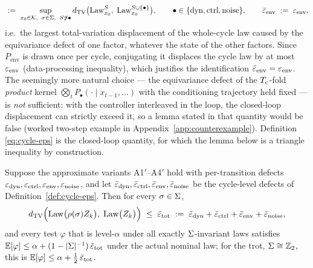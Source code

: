 \begin{definition}
\begin{equation}
  \;:=\;
  \sup_{x_0 \in \mathcal{K},\;\; \sigma \in \Sigma,\;\; S \not\ni \bullet}
  d_{\mathrm{TV}}\bigl( \operatorname{Law}^{S}_{x_0},\; \operatorname{Law}^{S \cup \{\bullet\}}_{x_0} \bigr),
  \qquad \bullet \in \{\mathrm{dyn}, \mathrm{ctrl}, \mathrm{noise}\},
  \qquad
  \bar\varepsilon_{\mathrm{env}} \;:=\; \varepsilon_{\mathrm{env}},
\end{equation}
i.e.\ the largest total-variation displacement of the whole-cycle law caused
by the equivariance defect of one factor, whatever the state of the other
factors. Since $P_{\mathrm{env}}$ is drawn once per cycle, conjugating it
displaces the cycle law by at most $\varepsilon_{\mathrm{env}}$ (data-processing inequality),
which justifies the identification $\bar\varepsilon_{\mathrm{env}} = \varepsilon_{\mathrm{env}}$. The seemingly
more natural choice --- the equivariance defect of the $T_{\mathrm{c}}$-fold
\emph{product} kernel $\bigotimes_t P_{\bullet}(\cdot \mid x_{t-1},\dots)$
with the conditioning trajectory held fixed --- is \emph{not} sufficient:
with the controller interleaved in the loop, the closed-loop displacement can
strictly exceed it, so a lemma stated in that quantity would be false (worked
two-step example in Appendix~\ref{app:counterexample}). Definition
\eqref{eq:cycle-eps} is the closed-loop quantity, for which the lemma below
is a triangle inequality by construction.
\end{definition}

\begin{lemma}
\label{lem:eps}
Suppose the approximate variants A1$'$--A4$'$ hold with per-transition
defects $\varepsilon_{\mathrm{dyn}}, \varepsilon_{\mathrm{ctrl}}, \varepsilon_{\mathrm{env}}, \varepsilon_{\mathrm{noise}}$, and let
$\bar\varepsilon_{\mathrm{dyn}}, \bar\varepsilon_{\mathrm{ctrl}}, \bar\varepsilon_{\mathrm{env}}, \bar\varepsilon_{\mathrm{noise}}$ be the
cycle-level defects of Definition~\ref{def:cycle-eps}. Then for every
$\sigma \in \Sigma$,
\begin{equation}
  \label{eq:eps-bound}
  d_{\mathrm{TV}}\Bigl( \operatorname{Law}\bigl(\rho(\sigma) Z_k\bigr),\; \operatorname{Law}\bigl(Z_k\bigr) \Bigr)
  \;\le\;
  \bar\varepsilon_{\mathrm{tot}} \;:=\; \bar\varepsilon_{\mathrm{dyn}} + \bar\varepsilon_{\mathrm{ctrl}} + \bar\varepsilon_{\mathrm{env}} + \bar\varepsilon_{\mathrm{noise}},
\end{equation}
and every test $\varphi$ that is level-$\alpha$ under all exactly
$\Sigma$-invariant laws satisfies
$\mathbb{E}[\varphi] \le \alpha + (1 - |\Sigma|^{-1})\,\bar\varepsilon_{\mathrm{tot}}$ under
the actual nominal law; for the trot, $\Sigma \cong \mathbb{Z}_2$, this is
$\mathbb{E}[\varphi] \le \alpha + \tfrac12\,\bar\varepsilon_{\mathrm{tot}}$.
\end{lemma}

